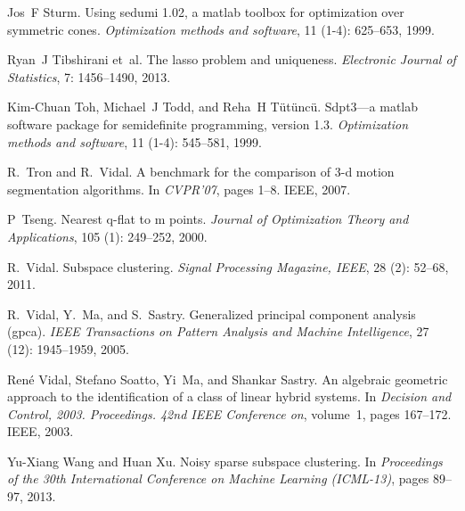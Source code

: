 \documentclass{ctexart}
\begin{document}
\begin{thebibliography}{47}
    Jos~F Sturm.
    \newblock Using sedumi 1.02, a matlab toolbox for optimization over symmetric
    cones.
    \newblock \emph{Optimization methods and software}, 11 (1-4):
    625--653, 1999.

    Ryan~J Tibshirani et~al.
    \newblock The lasso problem and uniqueness.
    \newblock \emph{Electronic Journal of Statistics}, 7: 1456--1490,
    2013.

    Kim-Chuan Toh, Michael~J Todd, and Reha~H T{\"u}t{\"u}nc{\"u}.
    \newblock Sdpt3—a matlab software package for semidefinite programming,
    version 1.3.
    \newblock \emph{Optimization methods and software}, 11 (1-4):
    545--581, 1999.

    R.~Tron and R.~Vidal.
    \newblock A benchmark for the comparison of 3-d motion segmentation algorithms.
    \newblock In \emph{CVPR'07}, pages 1--8. IEEE, 2007.

    P~Tseng.
    \newblock Nearest q-flat to m points.
    \newblock \emph{Journal of Optimization Theory and Applications}, 105
    (1): 249--252, 2000.

    R.~Vidal.
    \newblock Subspace clustering.
    \newblock \emph{Signal Processing Magazine, IEEE}, 28 (2):
    52--68, 2011.

    R.~Vidal, Y.~Ma, and S.~Sastry.
    \newblock Generalized principal component analysis (gpca).
    \newblock \emph{IEEE Transactions on Pattern Analysis and Machine
    Intelligence}, 27 (12): 1945--1959, 2005.

    Ren{\'e} Vidal, Stefano Soatto, Yi~Ma, and Shankar Sastry.
    \newblock An algebraic geometric approach to the identification of a class of
    linear hybrid systems.
    \newblock In \emph{Decision and Control, 2003. Proceedings. 42nd IEEE
    Conference on}, volume~1, pages 167--172. IEEE, 2003.

    Yu-Xiang Wang and Huan Xu.
    \newblock Noisy sparse subspace clustering.
    \newblock In \emph{Proceedings of the 30th International Conference on Machine
    Learning (ICML-13)}, pages 89--97, 2013.


\end{thebibliography}
\end{document}
